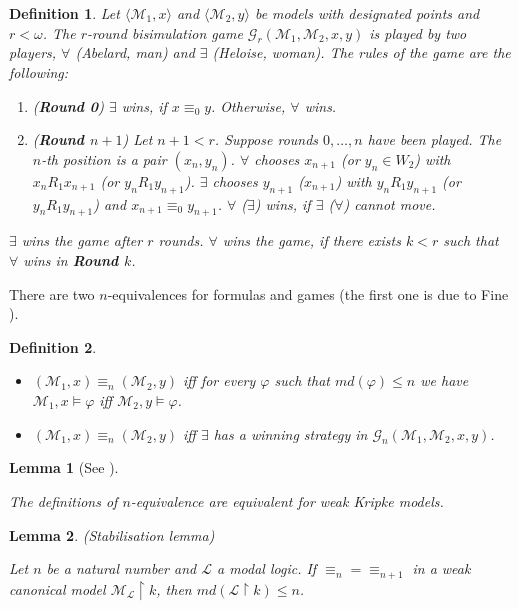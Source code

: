 \documentclass[a4paper]{article}
\theoremstyle{defin}
\newtheorem{defin}{Definition}
\theoremstyle{theorem}
\theoremstyle{prop}
\theoremstyle{lemma}
\newtheorem{lemma}{Lemma}
\theoremstyle{fact}
\theoremstyle{exercise}
\theoremstyle{ex}
\theoremstyle{col}
\theoremstyle{claim}
\begin{document}
\begin{defin}
  Let $\langle \mathcal{M}_1, x \rangle$ and $\langle \mathcal{M}_2, y \rangle$ be models with designated points and $r < \omega$. The $r$-round bisimulation game $\mathcal{G}_r(\mathcal{M}_1, \mathcal{M}_2, x, y)$ is played by two players, $\forall$ (Abelard, man) and $\exists$ (Heloise, woman). The rules of the game are the following:
  \begin{enumerate}
    \item ({\bf Round 0}) $\exists$ wins, if $x \equiv_0 y$. Otherwise, $\forall$ wins.
    \item ({\bf Round $n+1$}) Let $n + 1 < r$. Suppose rounds $0, \dots, n$ have been played.
    The $n$-th position is a pair $(x_n, y_n)$.
    $\forall$ chooses $x_{n + 1}$ (or $y_n \in W_2$) with $x_n R_1 x_{n + 1}$ (or $y_n R_1 y_{n + 1}$). $\exists$ chooses $y_{n + 1}$ ($x_{n + 1}$) with $y_n R_1 y_{n + 1}$ (or $y_n R_1 y_{n + 1}$) and $x_{n + 1} \equiv_0 y_{n + 1}$.
    $\forall$ ($\exists$) wins, if $\exists$ ($\forall$) cannot move.
  \end{enumerate}
  $\exists$ wins the game after $r$ rounds. $\forall$ wins the game, if there exists $k < r$ such that $\forall$ wins in {\bf Round $k$}.
\end{defin}

There are two $n$-equivalences for formulas and games (the first one is due to Fine \cite{fine1974logics}).

\begin{defin}
  $ $

  \begin{itemize}
  \item $(\mathcal{M}_1, x) \equiv_n (\mathcal{M}_2, y)$ iff for every $\varphi$ such that
  $md(\varphi) \leq n$ we have $\mathcal{M}_1, x \models \varphi$ iff $\mathcal{M}_2, y \models \varphi$.
  \item $(\mathcal{M}_1, x) \equiv_n (\mathcal{M}_2, y)$ iff $\exists$ has a winning strategy in $\mathcal{G}_n(\mathcal{M}_1, \mathcal{M}_2, x, y)$.
  \end{itemize}
\end{defin}

\begin{lemma} [See \cite{goranko20075}] \label{bisimequiv}

  The definitions of $n$-equivalence are equivalent for weak Kripke models.
\end{lemma}

\begin{lemma} (Stabilisation lemma)

  Let $n$ be a natural number and $\mathcal{L}$ a modal logic.
  If $\equiv_n = \equiv_{n + 1}$ in a weak canonical model $\mathcal{M}_{\mathcal{L}} \upharpoonright k$, then $md(\mathcal{L} \upharpoonright k) \leq n$.
\end{lemma}
\end{document}

